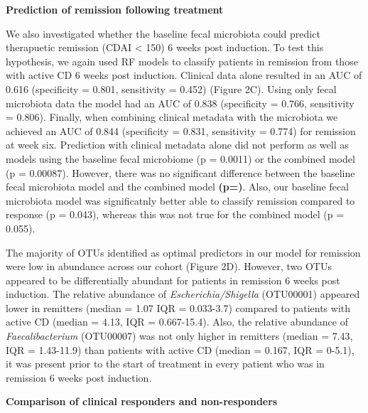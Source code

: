 \documentclass[11pt,]{article}
\begin{document}
\textbf{Prediction of remission following treatment}

We also investigated whether the baseline fecal microbiota could predict
therapuetic remission (CDAI \textless{} 150) 6 weeks post induction. To
test this hypothesis, we again used RF models to classify patients in
remission from those with active CD 6 weeks post induction. Clinical
data alone resulted in an AUC of 0.616 (specificity = 0.801, sensitivity
= 0.452) (Figure 2C). Using only fecal microbiota data the model had an
AUC of 0.838 (specificity = 0.766, sensitivity = 0.806). Finally, when
combining clinical metadata with the microbiota we achieved an AUC of
0.844 (specificity = 0.831, sensitivity = 0.774) for remission at week
six. Prediction with clinical metadata alone did not perform as well as
models using the baseline fecal microbiome (p = 0.0011) or the combined
model (p = 0.00087). However, there was no significant difference
between the baseline fecal microbiota model and the combined model
\textbf{(p=)}. Also, our baseline fecal microbiota model was
significatnly better able to classify remission compared to response (p
= 0.043), whereas this was not true for the combined model (p = 0.055).

The majority of OTUs identified as optimal predictors in our model for
remission were low in abundance across our cohort (Figure 2D). However,
two OTUs appeared to be differentially abundant for patients in
remission 6 weeks post induction. The relative abundance of
\emph{Escherichia/Shigella} (OTU00001) appeared lower in remitters
(median = 1.07 IQR = 0.033-3.7) compared to patients with active CD
(median = 4.13, IQR = 0.667-15.4). Also, the relative abundance of
\emph{Faecalibacterium} (OTU00007) was not only higher in remitters
(median = 7.43, IQR = 1.43-11.9) than patients with active CD (median =
0.167, IQR = 0-5.1), it was present prior to the start of treatment in
every patient who was in remission 6 weeks post induction.

\textbf{Comparison of clinical responders and non-responders}
\end{document}
